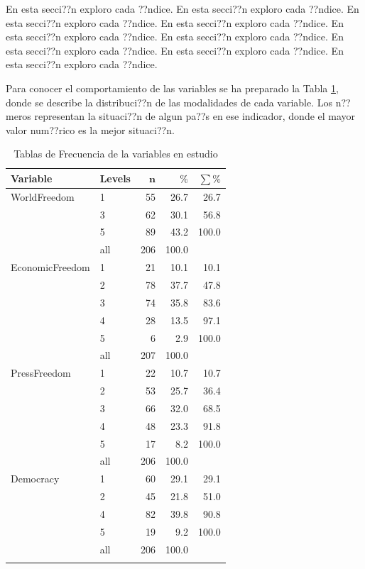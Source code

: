 \documentclass{article}
\begin{document}
En esta secci??n exploro cada ??ndice. En esta secci??n exploro cada ??ndice. En esta secci??n exploro cada ??ndice. En esta secci??n exploro cada ??ndice. En esta secci??n exploro cada ??ndice. En esta secci??n exploro cada ??ndice. En esta secci??n exploro cada ??ndice. En esta secci??n exploro cada ??ndice. En esta secci??n exploro cada ??ndice.





Para conocer el comportamiento de las variables se ha preparado la Tabla \ref{Tfrecuencias}, donde se describe la distribuci??n de las modalidades de cada variable. Los n??meros representan la situaci??n de algun pa??s en ese indicador, donde el mayor valor num??rico es la mejor situaci??n.

\begingroup\normalsize
\begin{longtable}{llrrr}
\caption{Tablas de Frecuencia de la variables en estudio} \\ 
 \textbf{Variable} & \textbf{Levels} & $\mathbf{n}$ & $\mathbf{\%}$ & $\mathbf{\sum \%}$ \\ 
  \hline \hline
WorldFreedom & 1 & 55 & 26.7 & 26.7 \\ 
   & 3 & 62 & 30.1 & 56.8 \\ 
   & 5 & 89 & 43.2 & 100.0 \\ 
   \hline
 & all & 206 & 100.0 &  \\ 
   \hline
\hline
EconomicFreedom & 1 & 21 & 10.1 & 10.1 \\ 
   & 2 & 78 & 37.7 & 47.8 \\ 
   & 3 & 74 & 35.8 & 83.6 \\ 
   & 4 & 28 & 13.5 & 97.1 \\ 
   & 5 & 6 & 2.9 & 100.0 \\ 
   \hline
 & all & 207 & 100.0 &  \\ 
   \hline
\hline
PressFreedom & 1 & 22 & 10.7 & 10.7 \\ 
   & 2 & 53 & 25.7 & 36.4 \\ 
   & 3 & 66 & 32.0 & 68.5 \\ 
   & 4 & 48 & 23.3 & 91.8 \\ 
   & 5 & 17 & 8.2 & 100.0 \\ 
   \hline
 & all & 206 & 100.0 &  \\ 
   \hline
\hline
Democracy & 1 & 60 & 29.1 & 29.1 \\ 
   & 2 & 45 & 21.8 & 51.0 \\ 
   & 4 & 82 & 39.8 & 90.8 \\ 
   & 5 & 19 & 9.2 & 100.0 \\ 
   \hline
 & all & 206 & 100.0 &  \\ 
   \hline
\hline
\hline
\label{Tfrecuencias}
\end{longtable}
\endgroup
\end{document}
